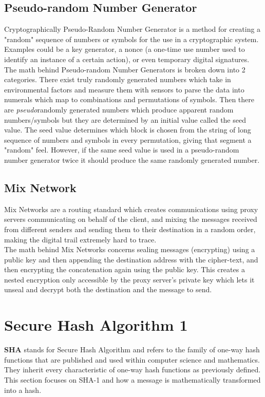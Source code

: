 \documentclass[12pt]{extarticle}
\begin{document}
\subsection{Pseudo-random Number Generator}
Cryptographically Pseudo-Random Number Generator is a method for creating a "random" sequence of numbers or symbols for the use in a cryptographic system. Examples could be a key generator, a nonce (a one-time use number used to identify an instance of a certain action), or even temporary digital signatures.\cite{src7}\\
The math behind Pseudo-random Number Generators is broken down into 2 categories. There exist truly randomly generated numbers which take in environmental factors and measure them with sensors to parse the data into numerals which map to combinations and permutations of symbols. Then there are {\slshape{pseudo}}randomly generated numbers which produce apparent random numbers/symbols but they are determined by an initial value called the seed value. The seed value determines which block is chosen from the string of long sequence of numbers and symbols in every permutation, giving that segment a "random" feel. However, if the same seed value is used in a pseudo-random number generator twice it should produce the same randomly generated number.
\subsection{Mix Network}
Mix Networks are a routing standard which creates communications using proxy servers communicating on behalf of the client, and mixing the messages received from different senders and sending them to their destination in a random order, making the digital trail extremely hard to trace.\cite{src7}\\
The math behind Mix Networks concerns sealing messages (encrypting) using a public key and then appending the destination address with the cipher-text, and then encrypting the concatenation again using the public key. This creates a nested encryption only accessible by the proxy server's private key which lets it unseal and decrypt both the destination and the message to send.
\section{Secure Hash Algorithm 1}
{\textbf{SHA}} stands for Secure Hash Algorithm and refers to the family of one-way hash functions that are published and used within computer science and mathematics. They inherit every characteristic of one-way hash functions as previously defined. This section focuses on SHA-1 and how a message is mathematically transformed into a hash.
\end{document}
